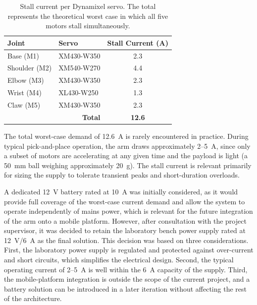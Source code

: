\begin{table}[htbp]
    \centering
    \renewcommand{\arraystretch}{1.3}
    \begin{tabular}{|l|l|c|}
        \hline
        \textbf{Joint} & \textbf{Servo} & \textbf{Stall Current (A)} \\
        \hline
        Base (M1)     & XM430-W350 & 2.3 \\
        \hline
        Shoulder (M2) & XM540-W270 & 4.4 \\
        \hline
        Elbow (M3)    & XM430-W350 & 2.3 \\
        \hline
        Wrist (M4)    & XL430-W250 & 1.3 \\
        \hline
        Claw (M5)     & XM430-W350 & 2.3 \\
        \hline
        \multicolumn{2}{|r|}{\textbf{Total}} & \textbf{12.6} \\
        \hline
    \end{tabular}
    \caption{Stall current per Dynamixel servo. The total represents 
    the theoretical worst case in which all five motors stall 
    simultaneously.}
    \label{tab:stall_currents}
\end{table}

The total worst-case demand of 12.6~A is rarely encountered in 
practice. During typical pick-and-place operation, the arm draws 
approximately 2--5~A, since only a subset of motors are accelerating 
at any given time and the payload is light (a 50~mm ball weighing 
approximately 20~g). The stall current is relevant primarily for 
sizing the supply to tolerate transient peaks and short-duration 
overloads.

A dedicated 12~V battery rated at 10~A was initially considered, as 
it would provide full coverage of the worst-case current demand and 
allow the system to operate independently of mains power, which is 
relevant for the future integration of the arm onto a mobile platform. 
However, after consultation with the project supervisor, it was 
decided to retain the laboratory bench power supply rated at 
12~V/6~A as the final solution. This decision was based on three 
considerations. First, the laboratory power supply is regulated and 
protected against over-current and short circuits, which simplifies 
the electrical design. Second, the typical operating current of 
2--5~A is well within the 6~A capacity of the supply. Third, the 
mobile-platform integration is outside the scope of the current 
project, and a battery solution can be introduced in a later 
iteration without affecting the rest of the architecture.

